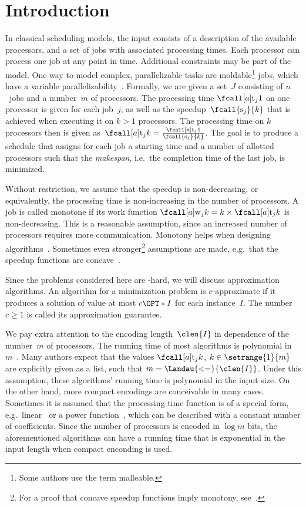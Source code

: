 \section{Introduction}

In classical scheduling models, the input consists of a description of the available processors,
and a set of jobs with associated processing times.
Each processor can process one job at any point in time.
Additional constraints may be part of the model.
One way to model complex, parallelizable tasks are moldable\footnote{Some authors use the term malleable.} jobs,
which have a variable parallelizability~\cite{du89}.
Formally, we are given a set~$J$ consisting of $n$~jobs and a number~$m$ of processors.
The processing time $\ptm{j}{1}$ on one processor is given for each job~$j$,
as well as the speedup~$\fcall{\mathrm{s}_j}{k}$ that is achieved when executing it on $k > 1$ processors.
The processing time on $k$ processors then is given as~$\ptm{j}{k} = \frac{\ptm{j}{1}}{\fcall{\mathrm{s}_j}{k}}$.
The goal is to produce a schedule that assigns for each job a starting time and a number of allotted processors
such that the \emph{makespan}, i.e.~the completion time of the last job, is minimized.

Without restriction, we assume that the speedup is non-decreasing,
or equivalently, the processing time is non-increasing in the number of processors.
A job is called monotone if its work function $\work{j}{k} = k \times \ptm{j}{k}$ is non-decreasing.
This is a reasonable assumption, since an increased number of processors requires more communication.
Monotony helps when designing algorithms~\cite{belkhale90,mounie99,mounie07}.
Sometimes even stronger\footnote{For a proof that concave speedup functions imply monotony, see~\cite{jansen12}.}
assumptions are made, e.g.~that the speedup functions are concave~\cite{blazewicz06,sanders11,jansen12}.

Since the problems considered here are -hard,
we will discuss approximation algorithms.
An algorithm for a minimization problem is $c$-approximate
if it produces a solution of value at most $c \OPT*{I}$ for each instance~$I$.
The number~$c \geq 1$ is called its approximation guarantee.

We pay extra attention to the encoding length~$\clen{I}$ in dependence of the number~$m$ of processors.
The running time of most algorithms is polynomial in~$m$~\cite{belkhale90,turek92,jansen03,jansen06a,mounie07,jansen10}.
Many authors expect that the values $\ptm{j}{k}$, $k \in \setrange{1}{m}$ are explicitly given as a list,
such that $m = \Landau{<=}{\clen{I}}$.
Under this assumption, these algorithms' running time is polynomial in the input size.
On the other hand, more compact encodings are conceivable in many cases.
Sometimes it is assumed that the processing time function is of a special form,
e.g.~linear~\cite{grigoriev06} or a power function~\cite{makarychev14},
which can be described with a constant number of coefficients.
Since the number of processors is encoded in $\log m$ bits,
the aforementioned algorithms can have a running time that is exponential in the input length
when compact enconding is used.

